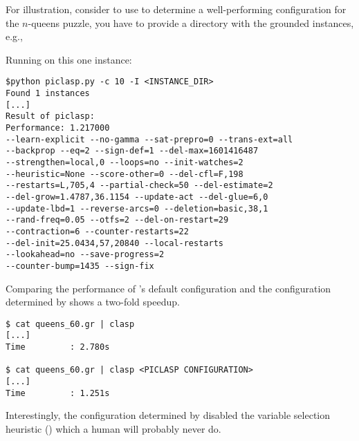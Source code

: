 \begin{example}
For illustration, consider to use \piclasp{} to determine a well-performing configuration for the $n$-queens puzzle, 
you have to provide a directory with the grounded instances, e.g., 

Running \piclasp{} on this one instance:
\begin{lstlisting}[numbers=none]
$python piclasp.py -c 10 -I <INSTANCE_DIR>
Found 1 instances
[...]
Result of piclasp:
Performance: 1.217000
--learn-explicit --no-gamma --sat-prepro=0 --trans-ext=all
--backprop --eq=2 --sign-def=1 --del-max=1601416487
--strengthen=local,0 --loops=no --init-watches=2
--heuristic=None --score-other=0 --del-cfl=F,198
--restarts=L,705,4 --partial-check=50 --del-estimate=2
--del-grow=1.4787,36.1154 --update-act --del-glue=6,0
--update-lbd=1 --reverse-arcs=0 --deletion=basic,38,1
--rand-freq=0.05 --otfs=2 --del-on-restart=29 
--contraction=6 --counter-restarts=22 
--del-init=25.0434,57,20840 --local-restarts 
--lookahead=no --save-progress=2
--counter-bump=1435 --sign-fix
\end{lstlisting}

Comparing the performance of \clasp{}'s default configuration
and the configuration determined by \piclasp{} shows a two-fold speedup.

\begin{lstlisting}[numbers=none]
$ cat queens_60.gr | clasp
[...]
Time         : 2.780s

$ cat queens_60.gr | clasp <PICLASP CONFIGURATION>
[...]
Time         : 1.251s
\end{lstlisting}

Interestingly, the configuration determined by \piclasp{} disabled the variable selection heuristic ()
which a human will probably never do.

\end{example}



